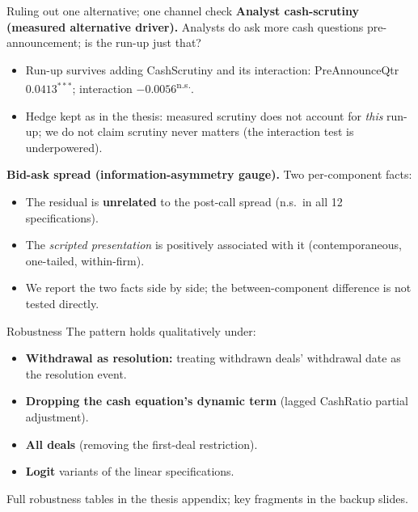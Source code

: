 \documentclass[aspectratio=169, 11pt]{beamer}
\newcommand{\ns}{\textsuperscript{n.s.}}
\begin{document}
\begin{frame}{Ruling out one alternative; one channel check}
  \textbf{Analyst cash-scrutiny (measured alternative driver).}
  Analysts do ask more cash questions pre-announcement; is the run-up just that?
  \begin{itemize}
    \item Run-up survives adding CashScrutiny and its interaction:
      PreAnnounceQtr $0.0413^{***}$; interaction $-0.0056$\ns.
    \item Hedge kept as in the thesis: measured scrutiny
      \alert{does not account for \emph{this} run-up}; we do not claim
      scrutiny never matters (the interaction test is underpowered).
  \end{itemize}
  \vspace{0.5em}
  \textbf{Bid-ask spread (information-asymmetry gauge).} Two per-component facts:
  \begin{itemize}
    \item The residual is \textbf{unrelated} to the post-call spread
      (n.s.\ in all 12 specifications).
    \item The \emph{scripted presentation} is positively associated with it
      (contemporaneous, one-tailed, within-firm).
    \item We report the two facts side by side; the between-component
      difference is \alert{not tested directly}.
  \end{itemize}
\end{frame}

\begin{frame}{Robustness}
  The pattern holds qualitatively under:
  \begin{itemize}
    \item[\checkmark] \textbf{Withdrawal as resolution:} treating withdrawn
      deals' withdrawal date as the resolution event.
    \item[\checkmark] \textbf{Dropping the cash equation's dynamic term}
      (lagged CashRatio partial adjustment).
    \item[\checkmark] \textbf{All deals} (removing the first-deal restriction).
    \item[\checkmark] \textbf{Logit} variants of the linear specifications.
  \end{itemize}
  \vspace{0.6em}
  {\small\color{mutedgray} Full robustness tables in the thesis appendix;
  key fragments in the backup slides.}
\end{frame}
\end{document}
